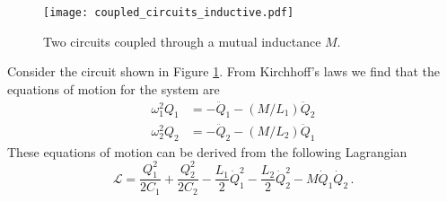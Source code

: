 
\begin{figure}
\begin{centering}
\texttt{[image: coupled\_circuits\_inductive.pdf]}
\par\end{centering}
\caption{Two circuits coupled through a mutual inductance $M$.}
\label{Fig:coupledCircuits_inductive}
\end{figure}


Consider the circuit shown in Figure \ref{Fig:coupledCircuits_inductive}.
From Kirchhoff's laws we find that the equations of motion for the system are
\begin{align}
\omega_1^2 Q_1 &= -\ddot{Q}_1 - \left(M/L_1\right) \ddot{Q}_2 \\
\omega_2^2 Q_2 &= -\ddot{Q}_2 - \left(M/L_2\right) \ddot{Q}_1
\end{align}
These equations of motion can be derived from the following Lagrangian
\begin{equation}
\mathcal{L} = \frac{Q_1^2}{2 C_1} + \frac{Q_2^2}{2 C_2}
- \frac{L_1}{2}\dot{Q}_1^2
- \frac{L_2}{2}\dot{Q}_2^2
- M \dot{Q}_1 \dot{Q}_2 \, . \label{eq:sec.coupling.subsec.inductiveCoupling:Lagrangian}
\end{equation}

